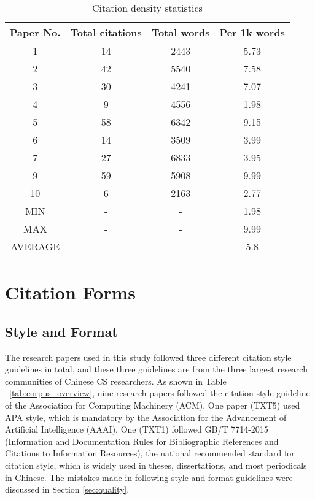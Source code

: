 \begin{table}[htb]
    \caption{Citation density statistics}
    \centering
      \begin{tabular}{cccc}
        \toprule[1.5pt]
        \textbf{Paper No.} & \textbf{Total citations} & \textbf{Total words} & \textbf{Per 1k words} \\
        \midrule[1pt]
        1 & 14 & 2443 & 5.73 \\
        2 & 42 & 5540 & 7.58\\
        3 & 30 & 4241 & 7.07\\
        4 & 9 & 4556 & 1.98\\
        5 & 58 & 6342 & 9.15\\
        6 & 14 & 3509 & 3.99\\
        7 & 27 & 6833 & 3.95\\
        9 & 59 & 5908 & 9.99\\
        10 & 6 & 2163 & 2.77\\
        MIN & - & - & 1.98\\
        MAX & - & - & 9.99\\
        AVERAGE & - & - & 5.8\\
        
      \bottomrule[1.5pt]
    \end{tabular}
    \label{tab:citation_density}
  \end{table}

\section{Citation Forms}
\label{sec:forms}
\subsection{Style and Format}
\label{subsec:style}

The research papers used in this study followed three different citation style guidelines in total, and these three guidelines are from the three largest research communities of Chinese CS researchers. As shown in Table ~\ref{tab:corpus_overview}, nine research papers followed the citation style guideline of the Association for Computing Machinery (ACM). One paper (TXT5) used APA style, which is mandatory by the Association for the Advancement of Artificial Intelligence (AAAI). One (TXT1) followed GB/T 7714-2015 (Information and Documentation Rules for Bibliographic References and Citations to Information Resources), the national recommended standard for citation style, which is widely used in theses, dissertations, and most periodicals in Chinese. The mistakes made in following style and format guidelines were discussed in Section \ref{sec:quality}.

